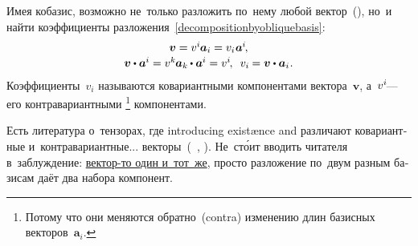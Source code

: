 \begin{otherlanguage}{russian}
\begin{tcolorbox}
\par\end{tcolorbox}

Имея кобазис, возможно не~только разложить по~нему любой вектор~(), но~и найти коэффициенты разложения~\eqref{decompositionbyobliquebasis}:
\begin{equation}\begin{array}{c}
\bm{v} = v^{i} \hspace{-0.1ex} \bm{a}_i = v_{i} \hspace{.1ex} \bm{a}^{\hspace{-0.05ex}i} \hspace{-0.25ex},
\\[.16em]
\bm{v} \dotp \bm{a}^{\hspace{-0.05ex}i} = v^{k} \hspace{-0.1ex} \bm{a}_k \hspace{-0.1ex} \dotp \bm{a}^{\hspace{-0.05ex}i} = v^{i} \hspace{-0.25ex}, \:\;
v_{i} \hspace{-0.1ex} = \bm{v} \dotp \bm{a}_i \hspace{.1ex} .
\end{array}\end{equation}
\noindent
Коэффициенты~${v_i}$ называются ко\-вариант\-ными компонентами вектора~$\bm{v}$, а~${v^i \hspace{-0.25ex}}$\:--- его контра\-вариант\-ными%
\footnote{Потому что они меняются обратно~(contra) изменению длин базисных векторов~${\bm{a}_i}$.}\hspace{-0.2ex}
компонентами.

Есть литература о~тензорах,
где introducing existænce
and различают ко\-вариант\-ные
и~контра\-вариант\-ные...
векторы~(~, ).
Не~ст\'{о}ит вводить читателя в~заблуждение:
\href{https://www.physicsforums.com/threads/is-a-vector-itself-contra-covariant-or-just-its-components.994318/}{вектор\hbox{-}то один и~тот~же}, просто разложение по~двум разным базисам даёт два набора компонент.




\end{otherlanguage}
